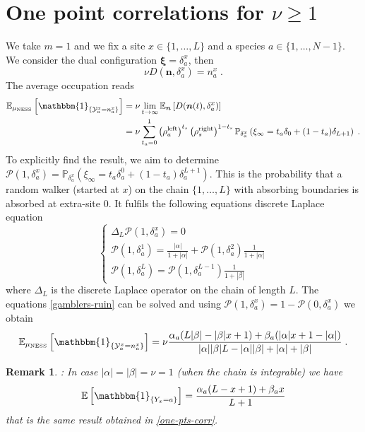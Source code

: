 \documentclass[10pt]{article}
\numberwithin{equation}{section}
\numberwithin{equation}{subsection}
\newtheorem{remark}{Remark}
\newcommand{\dt}{\;.}
\begin{document}
\section{One point correlations for $\nu\geq 1$}\label{appendix-1pts-general}
We take $m=1$ and we fix a site $x\in\{1,\ldots,L\}$ and a species $a\in \{1,\ldots,N-1\}$. We consider the dual configuration $\bm{\xi}=\delta_{a}^{x}$, then 
\begin{equation}
	\nu D(\bm{n},\delta_{a}^{x})=n_{a}^{x}\dt
\end{equation}
The average occupation reads
\begin{equation}\label{OnePtsCORR}
	\begin{split}
			\mathbb{E}_{\mu_{\text{NESS}}}\left[\mathbbm{1}_{\{\mathcal{Y}_{a}^{x}=n_{a}^{x}\}}\right]&=\nu\lim_{t\to\infty}\mathbb{E}_{\bm{n}}\left[D(\bm{n}(t),\delta_{a}^{x})\right]\\&=\nu\sum_{t_{a}=0}^{1}\left(\rho_{a}^{\text{left}}\right)^{t_{s}}\left(\rho_{s}^{\text{right}}\right)^{1-t_{s}}\mathbb{P}_{\delta_{a}^{x}}\left(\xi_{\infty}=t_{a}\delta_{0}+(1-t_{a})\delta_{L+1}\right)\dt
	\end{split}
\end{equation}
To explicitly find the result, we aim to determine $\mathcal{P}(1,\delta_{a}^{x})=\mathbb{P}_{\delta_{a}^{x}}\left(\xi_{\infty}=t_{a}\delta_{a}^{0}+(1-t_{a})\delta_{a}^{L+1}\right)$. This is the probability that a random walker 
(started at $x$) on the chain $\{1,\ldots,L\}$ with absorbing boundaries {\color{black}is absorbed at extra-site $0$. It fulfils the following equations discrete Laplace equation}
\begin{equation}\label{gamblers-ruin}
	\begin{cases}
		\Delta_{L}\mathcal{P}(1,\delta_{a}^{x})=0\\
		\mathcal{P}(1,\delta_{a}^{1})=\frac{|\alpha|}{1+|\alpha|}+\mathcal{P}(1,\delta_{a}^{2})\frac{1}{1+|\alpha|}\\
		\mathcal{P}(1,\delta_{a}^{L})=\mathcal{P}(1,\delta_{a}^{L-1})\frac{1}{1+|\beta|}
	\end{cases}
\end{equation}
where $\Delta_{L}$ is the discrete Laplace operator on the chain of length $L$. The equations \eqref{gamblers-ruin} can be solved and using $\mathcal{P}(1,\delta_{a}^{x})=1-\mathcal{P}(0,\delta_{a}^{x})$ we obtain 
\begin{equation}
	\mathbb{E}_{\mu_{\text{NESS}}}\left[\mathbbm{1}_{\{\mathcal{Y}_{a}^{x}=n_{a}^{x}\}}\right]=\nu\frac{\alpha_{a}(L|\beta|-|\beta|x+1)+\beta_{a}(|\alpha|x+1-|\alpha|)}{|\alpha||\beta|L-|\alpha||\beta|+|\alpha|+|\beta|}\dt
\end{equation}
\begin{remark}: In case $|\alpha|=|\beta|=\nu=1$ (when the chain is integrable) we have 
\begin{equation}
		\mathbb{E}\left[\mathbbm{1}_{\{Y_{x}=a\}}\right]=\frac{\alpha_{a}(L-x+1)+\beta_{a}x}{L+1}
\end{equation}
that is the same result obtained in \eqref{one-pts-corr}.  
\end{remark}
\end{document}
